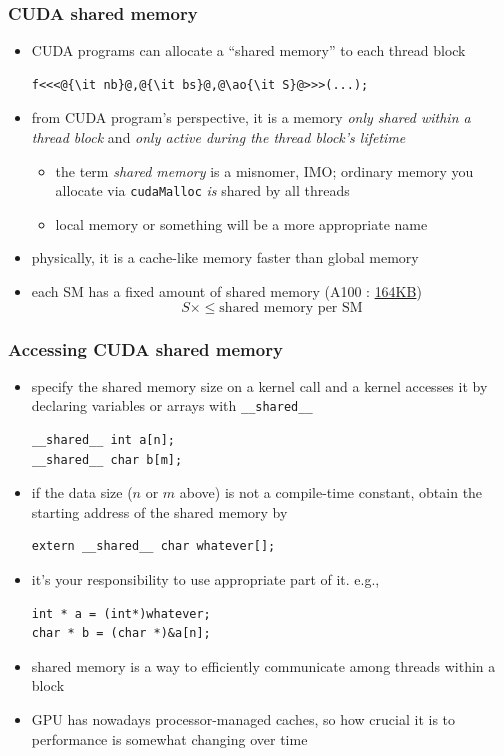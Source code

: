 \documentclass[12pt,dvipdfmx]{beamer}
\newcommand{\ao}[1]{{\color{blue}#1}}
\begin{document}
\begin{frame}[fragile]
  \frametitle{CUDA shared memory}
  \begin{itemize}
  \item CUDA programs can allocate a ``shared memory'' to each thread block

\begin{lstlisting}
f<<<@{\it nb}@,@{\it bs}@,@\ao{\it S}@>>>(...);
\end{lstlisting}

\item from CUDA program's perspective, it is a memory {\it only shared within a thread block} and
  {\it only active during the thread block's lifetime}
  \begin{itemize}
  \item the term {\it shared memory} is a misnomer, IMO;
    ordinary memory you allocate via {\tt cudaMalloc}
    {\it is} shared by all threads
  \item local memory or something will be a more appropriate name
  \end{itemize}
  
\item physically, it is a cache-like memory faster than global memory

\item each SM has a fixed amount of shared memory
  (A100 : \href{https://docs.nvidia.com/cuda/ampere-tuning-guide/index.html#sm-occupancy}{164KB})
  \[ S \times \leq \mbox{shared memory per SM} \]
  \end{itemize}
\end{frame}

\begin{frame}[fragile]
  \frametitle{Accessing CUDA shared memory}
  \begin{itemize}
  \item specify the shared memory size on a kernel call and 
    a kernel accesses it by declaring variables or arrays with
    \ao{\tt \_\_shared\_\_}
\begin{lstlisting}
__shared__ int a[n];
__shared__ char b[m];
\end{lstlisting}
\item if the data size ($n$ or $m$ above) is not a compile-time constant,
  obtain the starting address of the shared memory by
\begin{lstlisting}
extern __shared__ char whatever[];
\end{lstlisting}
\item it's your responsibility to use appropriate part of it. e.g.,
\begin{lstlisting}
int * a = (int*)whatever;
char * b = (char *)&a[n];
\end{lstlisting}
\item shared memory is a way to efficiently communicate among threads within a block
\item GPU has nowadays processor-managed caches,
  so how crucial it is to performance is somewhat changing over time
\end{itemize}
\end{frame}
\end{document}

